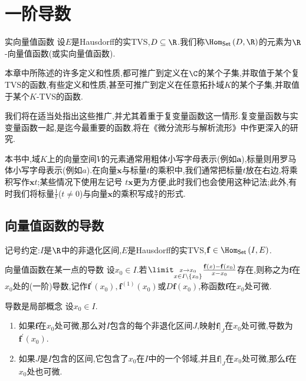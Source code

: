\chapter{一阶导数}

\begin{definition}{实向量值函数}{}
	设$E$是Hausdorff的实TVS,$D\subseteq\R$.我们称$\Hom_{\mathsf{Set}}\left(D,\R\right)$的元素为$\R$-向量值函数(或实向量值函数).
\end{definition}

\begin{remark}{}{}
	本章中所陈述的许多定义和性质,都可推广到定义在$\C$的某个子集,并取值于某个复TVS的函数,有些定义和性质,甚至可推广到定义在任意拓扑域$K$的某个子集,并取值于某个$K$-TVS的函数.
	
	我们将在适当处指出这些推广,并尤其着重于复变量函数这一情形.复变量函数与实变量函数一起,是迄今最重要的函数,将在《微分流形与解析流形》中作更深入的研究.
\end{remark}

\begin{convention}{}{}
	本书中,域$K$上的向量空间$V$的元素通常用粗体小写字母表示(例如$\mathbf{a}$),标量则用罗马体小写字母表示(例如$a$).在向量$\mathbf{x}$与标量$t$的乘积中,我们通常把标量$t$放在右边,将乘积写作$\mathbf{x}t$;某些情况下使用左记号 $t\mathbf{x}$更为方便,此时我们也会使用这种记法;此外,有时我们将标量$\frac{1}{t}$($t\neq 0$)与向量$\mathbf{x}$的乘积写成$\frac{\mathbf{x}}{t}$的形式.
\end{convention}

\section{向量值函数的导数}

记号约定:$I$是$\R$中的非退化区间,$E$是Hausdorff的实TVS,$\mathbf{f}\in\Hom_{\mathsf{Set}}\left(I,E\right)$.

\begin{definition}{向量值函数在某一点的导数}{}
	设$x_{0}\in I$.若$\limit_{\substack{x\to x_{0}\\ x\in I\setminus\left\{x_{0}\right\}}}\frac{\mathbf{f}\left(x\right)-\mathbf{f}\left(x_{0}\right)}{x-x_{0}}$存在,则称之为$\mathbf{f}$在$x_{0}$处的(一阶)导数,记作$\mathbf{f}^{\prime}\left(x_{0}\right),\mathbf{f}^{\left(1\right)}\left(x_{0}\right)$或$D\mathbf{f}\left(x_{0}\right)$,称函数$\mathbf{f}$在$x_{0}$处可微.
\end{definition}

\begin{proposition}{导数是局部概念}{}
	设$x_{0}\in I$.
	\begin{enumerate}
		\item 如果$\mathbf{f}$在$x_{0}$处可微,那么对$I$包含的每个非退化区间$J$,映射$\mathbf{f}|_{J}$在$x_{0}$处可微,导数为$\mathbf{f}^{\prime}\left(x_{0}\right)$.
		\item 如果$J$是$I$包含的区间,它包含了$x_{0}$在$I$中的一个邻域,并且$\mathbf{f}|_{J}$在$x_{0}$处可微,那么$\mathbf{f}$在$x_{0}$处也可微.
	\end{enumerate}
\end{proposition}

